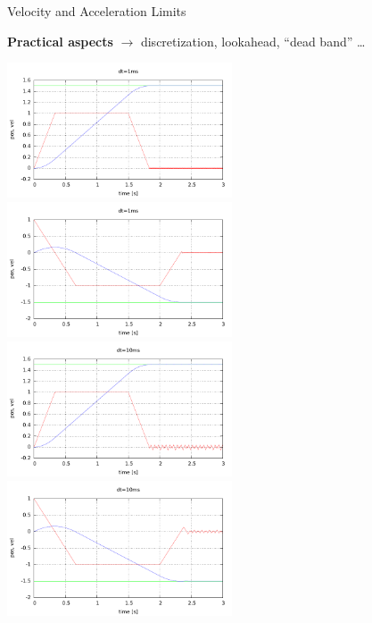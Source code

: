 \documentclass{beamer}
\begin{document}
\begin{frame}{Velocity and Acceleration Limits}
  
  \textbf{Practical aspects} $\rightarrow$ discretization, lookahead, ``dead band'' \ldots

  \includegraphics[width=0.5\textwidth]{p0.pdf}%
  \includegraphics[width=0.5\textwidth]{p2.pdf}\\
  \includegraphics[width=0.5\textwidth]{p1.pdf}%
  \includegraphics[width=0.5\textwidth]{p3.pdf}
  
\end{frame}
\end{document}
